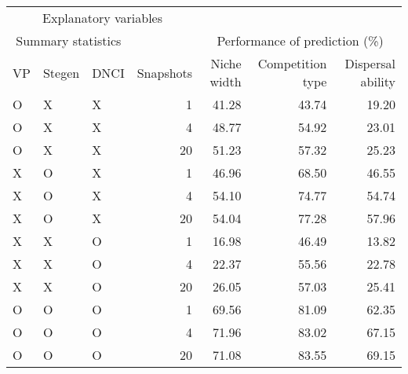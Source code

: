 \begin{longtable}{lllrrrr}
\toprule
\multicolumn{4}{c}{Explanatory variables} &  &  &  \\ 
\cmidrule(lr){1-4}
\multicolumn{3}{c}{Summary statistics} &  & \multicolumn{3}{c}{Performance of prediction (\%)} \\ 
\cmidrule(lr){1-3} \cmidrule(lr){5-7}
VP & Stegen & DNCI & Snapshots & Niche width & Competition type & Dispersal ability \\ 
\midrule
O & X & X & 1 & 41.28 & 43.74 & 19.20 \\ 
O & X & X & 4 & 48.77 & 54.92 & 23.01 \\ 
O & X & X & 20 & 51.23 & 57.32 & 25.23 \\ 
X & O & X & 1 & 46.96 & 68.50 & 46.55 \\ 
X & O & X & 4 & 54.10 & 74.77 & 54.74 \\ 
X & O & X & 20 & 54.04 & 77.28 & 57.96 \\ 
X & X & O & 1 & 16.98 & 46.49 & 13.82 \\ 
X & X & O & 4 & 22.37 & 55.56 & 22.78 \\ 
X & X & O & 20 & 26.05 & 57.03 & 25.41 \\ 
O & O & O & 1 & 69.56 & 81.09 & 62.35 \\ 
O & O & O & 4 & 71.96 & 83.02 & 67.15 \\ 
O & O & O & 20 & 71.08 & 83.55 & 69.15 \\ 
\bottomrule
\end{longtable}

